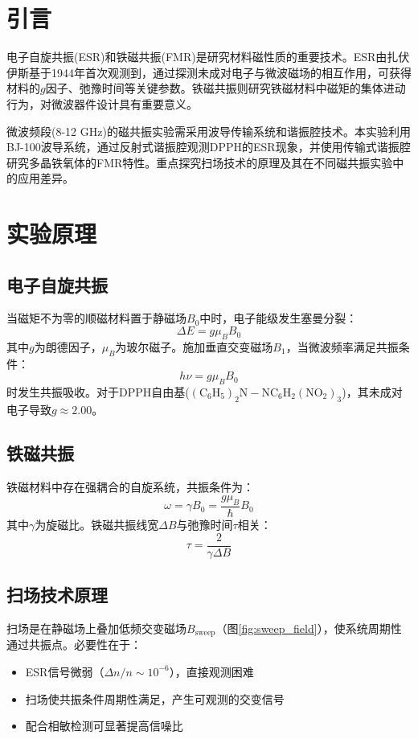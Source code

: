 \documentclass{thuemp}
\begin{document}
\section{引言}
\enlargethispage{-3.3cm}
电子自旋共振(ESR)和铁磁共振(FMR)是研究材料磁性质的重要技术。ESR由扎伏伊斯基于1944年首次观测到\cite{esr_origin}，通过探测未成对电子与微波磁场的相互作用，可获得材料的$g$因子、弛豫时间等关键参数。铁磁共振则研究铁磁材料中磁矩的集体进动行为\cite{fmr_theory}，对微波器件设计具有重要意义。

微波频段(8-12 GHz)的磁共振实验需采用波导传输系统和谐振腔技术。本实验利用BJ-100波导系统，通过反射式谐振腔观测DPPH的ESR现象，并使用传输式谐振腔研究多晶铁氧体的FMR特性。重点探究扫场技术的原理及其在不同磁共振实验中的应用差异。

\section{实验原理}

\subsection{电子自旋共振}
当磁矩不为零的顺磁材料置于静磁场$B_0$中时，电子能级发生塞曼分裂：
\begin{equation}
\Delta E = g\mu_B B_0
\end{equation}
其中$g$为朗德因子，$\mu_B$为玻尔磁子。施加垂直交变磁场$B_1$，当微波频率满足共振条件：
\begin{equation}
h\nu = g\mu_B B_0
\end{equation}
时发生共振吸收。对于DPPH自由基($\mathrm{(C_6H_5)_2N-NC_6H_2(NO_2)_3}$)，其未成对电子导致$g \approx 2.00$。

\subsection{铁磁共振}
铁磁材料中存在强耦合的自旋系统，共振条件为：
\begin{equation}
\omega = \gamma B_0 = \frac{g\mu_B}{\hbar} B_0
\end{equation}
其中$\gamma$为旋磁比。铁磁共振线宽$\Delta B$与弛豫时间$\tau$相关：
\begin{equation}
\tau = \frac{2}{\gamma \Delta B}
\end{equation}

\subsection{扫场技术原理}
扫场是在静磁场上叠加低频交变磁场$B_{\mathrm{sweep}}$（图\ref{fig:sweep_field}），使系统周期性通过共振点。必要性在于：
\begin{itemize}
    \item ESR信号微弱（$\Delta n/n \sim 10^{-6}$），直接观测困难
    \item 扫场使共振条件周期性满足，产生可观测的交变信号
    \item 配合相敏检测可显著提高信噪比
\end{itemize}
\end{document}
